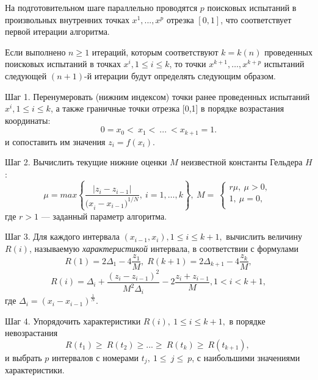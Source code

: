 \documentclass[10pt,a4paper]{book}
\begin{document}
На подготовительном шаге параллельно проводятся $p$ поисковых испытаний в произвольных внутренних точках $x^1, ...,x^p$ отрезка $[0,1]$, что соответствует первой итерации  алгоритма. 

Если выполнено $n\geq1$ итераций, которым соответствуют $k=k(n)$ проведенных поисковых испытаний в точках $x^i, 1\leq i\leq k$, то точки $x^{k+1},\ldots,x^{k+p}$ испытаний следующей $(n+1)$-й итерации будут определять следующим образом.

 Шаг 1. Перенумеровать (нижним индексом) точки ранее проведенных испытаний $x^i, 1\leq i\leq k$, а также граничные точки отрезка [0,1] в порядке возрастания координаты:
 \begin{equation}
\label{agp1_sort}
	0=x_0<\ x_1<\ ...\ <x_{k+1}=1.
	\end{equation}
	и сопоставить им значения $z_i=f(x_i)$. 
	
Шаг 2. Вычислить текущие нижние оценки $M$ неизвестной константы Гельдера $H$:
 \begin{equation}
\label{agp2_mu}
	\mu=max\left\{\frac{|z_i-z_{i-1}|}{{{(x}_i-x_{i-1})}^{1/N}},\ i=1,\ldots,k\right\},\ M=\ \left\{\begin{matrix}r\mu,\ \mu>0,\\1,\ \mu=0,\\\end{matrix}\right.\
	\end{equation}
где $r>1$ --- заданный параметр алгоритма.
   
Шаг 3. Для каждого интервала $(x_{i-1},x_i), 1\leq i\leq k+1,$ вычислить величину $R(i)$, называемую \textit{характеристикой} интервала, в соответствии с формулами
\begin{equation}
\label{agp3_R1}
R(1)=2\Delta_1-4\dfrac{z_1}{M}, \; R(k+1)=2\Delta_{k+1}-4\dfrac{z_k}{M},
\end{equation}
\begin{equation}
\label{agp3_Ri}
R(i)=\Delta_i+\dfrac{(z_i-z_{i-1})^2}{M^2\Delta_i}-2\dfrac{z_i+z_{i-1}}{M},1<i<k+1,
\end{equation}
где \(\Delta_i=(x_i-x_{i-1})^\frac{1}{N}\).
   
Шаг 4.  Упорядочить характеристики $R\left(i\right),\ 1\leq i \leq k+1,$ в порядке невозрастания 
\begin{equation}
\label{agp4_R_sort}
	R\left(t_1\right)\geq\ R\left(t_2\right)\geq...\geq\ R\left(t_k\right)\geq\ R(t_{k+1}),\ 
\end{equation}	
и выбрать $p$ интервалов с номерами $t_j,\ 1\le\ j\le\ p$, с наибольшими значениями характеристики.
\end{document}
